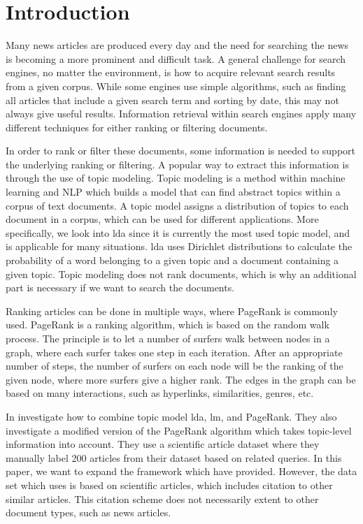 	
	\section{Introduction} 
	
	
	Many news articles are produced every day and the need for searching the news is becoming a more prominent and difficult task.
	A general challenge for search engines, no matter the environment, is how to acquire relevant search results from a given corpus. 
	While some engines use simple algorithms, such as finding all articles that include a given search term and sorting by date, this may not always give useful results.
	Information retrieval within search engines apply many different techniques for either ranking or filtering documents\cite{google_pagerank2006}.
	
	In order to rank or filter these documents, some information is needed to support the underlying ranking or filtering.
	A popular way to extract this information is through the use of topic modeling.
	Topic modeling is a method within machine learning and \gls{NLP} which builds a model that can find abstract topics within a corpus of text documents.
	A topic model assigns a distribution of topics to each document in a corpus, which can be used for different applications.
	More specifically, we look into \gls{lda} since it is currently the most used topic model, and is applicable for many situations\cite{lda}.
	\gls{lda} uses Dirichlet distributions to calculate the probability of a word belonging to a given topic and a document containing a given topic.
	Topic modeling does not rank documents, which is why an additional part is necessary if we want to search the documents.
	
	Ranking articles can be done in multiple ways, where PageRank is commonly used\cite{google_pagerank2006}.
	PageRank\cite{pagerank_1999} is a ranking algorithm, which is based on the random walk process.
	The principle is to let a number of surfers walk between nodes in a graph, where each surfer takes one step in each iteration.
	After an appropriate number of steps, the number of surfers on each node will be the ranking of the given node, where more surfers give a higher rank.
	The edges in the graph can be based on many interactions, such as hyperlinks, similarities, genres, etc.
	
	In \cite{yang2009topic} \citeauthor{yang2009topic} investigate how to combine topic model \gls{lda}, \gls{lm}, and PageRank.
	They also investigate a modified version of the PageRank algorithm which takes topic-level information into account.
	They use a scientific article dataset where they manually label 200 articles from their dataset based on related queries. 
	In this paper, we want to expand the framework which \cite{yang2009topic} have provided.
	However, the data set which \cite{yang2009topic} uses is based on scientific articles, which includes citation to other similar articles.
	This citation scheme does not necessarily extent to other document types, such as news articles.
	
